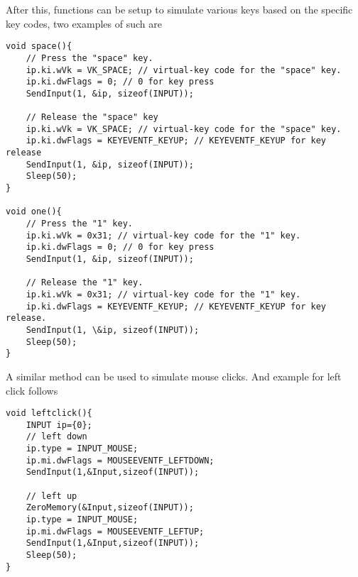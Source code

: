 After this, functions can be setup to simulate various keys based on the specific key codes, two examples of such are
\begin{lstlisting}
void space(){ 
	// Press the "space" key.  
	ip.ki.wVk = VK_SPACE; // virtual-key code for the "space" key.                                                                                
	ip.ki.dwFlags = 0; // 0 for key press                                                                                                        
	SendInput(1, &ip, sizeof(INPUT));
	
	// Release the "space" key                                                                                                                   
	ip.ki.wVk = VK_SPACE; // virtual-key code for the "space" key.                                                                                
	ip.ki.dwFlags = KEYEVENTF_KEYUP; // KEYEVENTF_KEYUP for key release                                                                          
	SendInput(1, &ip, sizeof(INPUT));
	Sleep(50);
}

void one(){ 
	// Press the "1" key.    
	ip.ki.wVk = 0x31; // virtual-key code for the "1" key.                                          
	ip.ki.dwFlags = 0; // 0 for key press                                                                                                        
	SendInput(1, &ip, sizeof(INPUT));
	
	// Release the "1" key.                                                                                                                    
	ip.ki.wVk = 0x31; // virtual-key code for the "1" key.                                                                                      
	ip.ki.dwFlags = KEYEVENTF_KEYUP; // KEYEVENTF_KEYUP for key release.                                                                          
	SendInput(1, \&ip, sizeof(INPUT));
	Sleep(50);
}
\end{lstlisting}

A similar method can be used to simulate mouse clicks. And example for left click follows
\begin{lstlisting}
void leftclick(){
	INPUT ip={0};
	// left down                                                                                                                                   
	ip.type = INPUT_MOUSE;
	ip.mi.dwFlags = MOUSEEVENTF_LEFTDOWN;
	SendInput(1,&Input,sizeof(INPUT));
	
	// left up                                                                                                                                     
	ZeroMemory(&Input,sizeof(INPUT));
	ip.type = INPUT_MOUSE;
	ip.mi.dwFlags = MOUSEEVENTF_LEFTUP;
	SendInput(1,&Input,sizeof(INPUT));
	Sleep(50);
}
\end{lstlisting}












